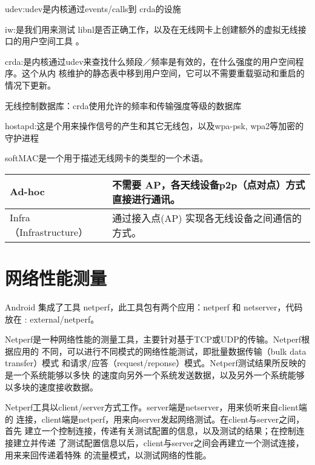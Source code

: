 \documentclass[a4paper,11pt,]{article}%
\begin{document}
udev:udev是内核通过events/calls到 crda的设施

iw:是我们用来测试 libnl是否正确工作，以及在无线网卡上创建额外的虚拟无线接口的用户空间工具 。

crda:是内核通过udev来查找什么频段／频率是有效的，在什么强度的用户空间程序。这个从内
核维护的静态表中移到用户空间，它可以不需要重载驱动和重启的情况下更新。

无线控制数据库：crda使用允许的频率和传输强度等级的数据库

hostapd:这是个用来操作信号的产生和其它无线包，以及wpa-psk, wpa2等加密的守护进程

softMAC是一个用于描述无线网卡的类型的一个术语。


\begin{tabular}{|p{}|p{}|}\hline
Ad-hoc & 不需要 AP，各天线设备p2p（点对点）方式直接进行通讯。\\\hline
Infra（Infrastructure） &通过接入点(AP) 实现各无线设备之间通信的方式。 \\\hline
\end{tabular}


\section{网络性能测量}
Android 集成了工具 netperf，此工具包有两个应用：netperf 和 netserver，代码放在
: external/netperf。

Netperf是一种网络性能的测量工具，主要针对基于TCP或UDP的传输。Netperf根据应用的
不同，可以进行不同模式的网络性能测试，即批量数据传输（bulk data transfer）模式
和请求/应答（request/reponse）模式。Netperf测试结果所反映的是一个系统能够以多快
的速度向另外一个系统发送数据，以及另外一个系统能够以多块的速度接收数据。

Netperf工具以client/server方式工作。server端是netserver，用来侦听来自client端的
连接，client端是netperf，用来向server发起网络测试。在client与server之间，首先
建立一个控制连接，传递有关测试配置的信息，以及测试的结果；在控制连接建立并传递
了测试配置信息以后，client与server之间会再建立一个测试连接，用来来回传递着特殊
的流量模式，以测试网络的性能。


\newpage
\end{document}
